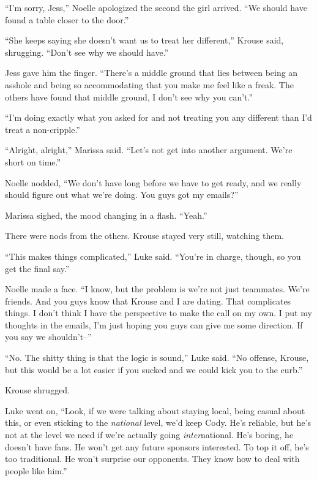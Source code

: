 ``I'm sorry, Jess,'' Noelle apologized the second the girl arrived.  ``We should have found a table closer to the door.''



``She keeps saying she doesn't want us to treat her different,'' Krouse said, shrugging.  ``Don't see why we should have.''



Jess gave him the finger.  ``There's a middle ground that lies between being an asshole and being so accommodating that you make me feel like a freak.  The others have found that middle ground, I don't see why you can't.''



``I'm doing exactly what you asked for and not treating you any different than I'd treat a non-cripple.''



``Alright, alright,'' Marissa said.  ``Let's not get into another argument.  We're short on time.''



Noelle nodded, ``We don't have long before we have to get ready, and we really should figure out what we're doing.  You guys got my emails?''



Marissa sighed, the mood changing in a flash.  ``Yeah.''



There were nods from the others.  Krouse stayed very still, watching them.



``This makes things complicated,'' Luke said.  ``You're in charge, though, so you get the final say.''



Noelle made a face.  ``I know, but the problem is we're not just teammates.  We're friends.  And you guys know that Krouse and I are dating.  That complicates things.  I don't think I have the perspective to make the call on my own.  I put my thoughts in the emails, I'm just hoping you guys can give me some direction.  If you say we shouldn't--''



``No.  The shitty thing is that the logic is sound,'' Luke said.  ``No offense, Krouse, but this would be a lot easier if you sucked and we could kick you to the curb.''



Krouse shrugged.



Luke went on, ``Look, if we were talking about staying local, being casual about this, or even sticking to the \emph{national} level, we'd keep Cody.  He's reliable, but he's not at the level we need if we're actually going \emph{inter}national.  He's boring, he doesn't have fans.  He won't get any future sponsors interested.  To top it off, he's too traditional.  He won't surprise our opponents.  They know how to deal with people like him.''



